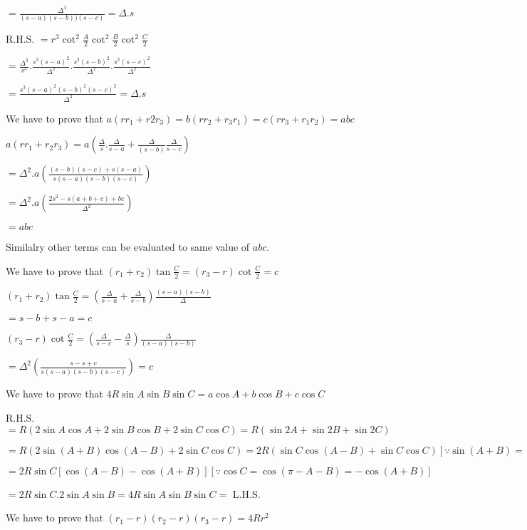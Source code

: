   $= \frac{\Delta^3}{(s - a)(s - b))(s - c)} = \Delta .s$

  R.H.S. $= r^3\cot^2\frac{A}{2}\cot^2\frac{B}{2}\cot^2\frac{C}{2}$

  $= \frac{\Delta^3}{s^3}.\frac{s^2(s - a)^2}{\Delta^2}.\frac{s^2(s - b)^2}{\Delta^2}.\frac{s^2(s - c)^2}{\Delta^2}$

  $= \frac{s^3(s - a)^2(s - b)^2(s - c)^2}{\Delta^3} = \Delta .s$

\item We have to prove that $a(rr_1 + r2r_3) = b(rr_2 + r_3r_1) = c(rr_3 + r_1r_2) = abc$

  $a(rr_1 + r_2r_3) = a\left(\frac{\Delta}{s}.\frac{\Delta}{s - a} + \frac{\Delta}{(s - b)}\frac{\Delta}{s - c}\right)$

  $= \Delta^2.a\left(\frac{(s - b)(s - c) + s(s - a)}{s(s - a)(s - b)(s - c)}\right)$

  $= \Delta^2.a\left(\frac{2s^2 - s(a + b + c) + bc}{\Delta^2}\right)$

  $= abc$

  Similalry other terms can be evaluated to same value of $abc.$

\item We have to prove that $(r_1 + r_2)\tan\frac{C}{2} = (r_3 - r)\cot\frac{C}{2} = c$

  $(r_1 + r_2)\tan\frac{C}{2} = \left(\frac{\Delta}{s - a} + \frac{\Delta}{s - b}\right)\frac{(s - a)(s - b)}{\Delta}$

  $= s - b + s - a = c$

  $(r_3 - r)\cot\frac{C}{2} = \left(\frac{\Delta}{s - c} - \frac{\Delta}{s}\right)\frac{\Delta}{(s - a)( s - b)}$

  $= \Delta^2\left(\frac{s - s + c}{s(s - a)(s - b)(s - c)}\right) = c$

\item We have to prove that $4R\sin A\sin B\sin C = a\cos A + b\cos B + c\cos C$

  R.H.S. $= R(2\sin A\cos A + 2\sin B\cos B + 2\sin C\cos C) = R(\sin 2A + \sin 2B + \sin 2C)$

  $= R(2\sin(A + B)\cos(A - B) + 2\sin C\cos C) = 2R(\sin C\cos(A - B) + \sin C\cos C)[\because \sin(A + B) =
    \sin(\pi - C) = \sin C]$

  $= 2R\sin C[\cos(A - B) - \cos(A + B)][\because \cos C = \cos(\pi - A - B) = -\cos(A + B)]$

  $= 2R\sin C. 2\sin A\sin B = 4R\sin A\sin B\sin C =$ L.H.S.

\item We have to prove that $(r_1 - r)(r_2 - r)(r_3 - r) = 4Rr^2$

